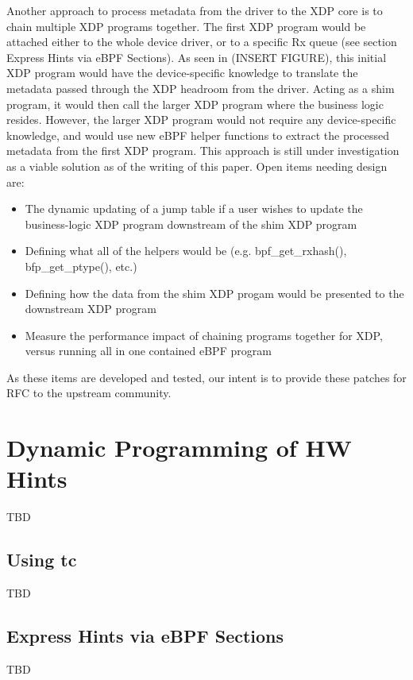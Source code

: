 \documentclass[letterpaper]{article}
\begin{document}
Another approach to process metadata from the driver to the XDP core is to chain multiple XDP programs together. The first XDP program would be attached either to the whole device driver, or to a specific Rx queue (see section Express Hints via eBPF Sections). As seen in (INSERT FIGURE), this initial XDP program would have the device-specific knowledge to translate the metadata passed through the XDP headroom from the driver. Acting as a shim program, it would then call the larger XDP program where the business logic resides. However, the larger XDP program would not require any device-specific knowledge, and would use new eBPF helper functions to extract the processed metadata from the first XDP program.
\newline
\indent This approach is still under investigation as a viable solution as of the writing of this paper. Open items needing design are:
\begin{itemize}
\item The dynamic updating of a jump table if a user wishes to update the business-logic XDP program downstream of the shim XDP program
\item Defining what all of the helpers would be (e.g. bpf\_get\_rxhash(), bfp\_get\_ptype(), etc.)
\item Defining how the data from the shim XDP progam would be presented to the downstream XDP program
\item Measure the performance impact of chaining programs together for XDP, versus running all in one contained eBPF program
\end{itemize}
As these items are developed and tested, our intent is to provide these patches for RFC to the upstream community.

\section{Dynamic Programming of HW Hints}

TBD

\subsection{Using tc}

TBD

\subsection{Express Hints via eBPF Sections}

TBD
\end{document}
